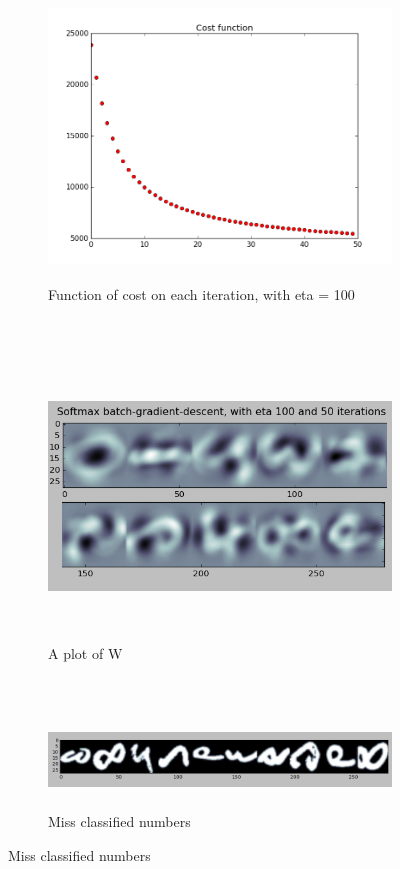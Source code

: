 \documentclass[paper=a4, fontsize=11pt]{scrartcl} %
\numberwithin{equation}{section} %
\numberwithin{figure}{section} %
\numberwithin{table}{section} %
\begin{document}
	\begin{figure}[!htb]
    	\begin{subfigure}[t]{\textwidth}
    		\centering
    		\includegraphics[height=3in]{softcostfun}
            \caption*{Function of cost on each iteration, with eta = 100}
    	\end{subfigure}
        ~
        \newline
        \newline
        \newline
        \begin{subfigure}[t]{\textwidth}
        	\centering
    		\includegraphics[height=3in]{softmax0-9}
            \caption*{A plot of W}
    	\end{subfigure}
        ~
        \newline
        \newline
        \newline
        \begin{subfigure}[t]{\textwidth}
        	\centering
    		\includegraphics[height=1in]{missclassified}
            \caption*{Miss classified numbers}
    	\end{subfigure}
    \end{figure}
\end{document}
